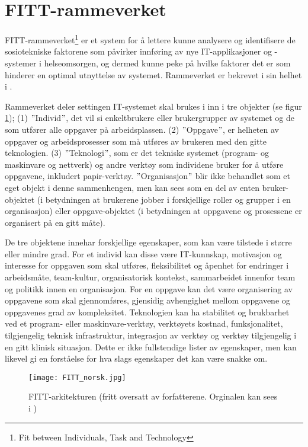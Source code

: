 \section{FITT-rammeverket}
\label{sec:fitt-rammeverket}

FITT-rammeverket\footnote{Fit between Individuals, Task and Technology} er et system for å lettere kunne analysere og identifisere de sosiotekniske faktorene som påvirker innføring av nye IT-applikasjoner og -systemer i helseomsorgen, og dermed kunne peke på hvilke faktorer det er som hinderer en optimal utnyttelse av systemet. Rammeverket er bekrevet i sin helhet i \citep{FITT}.

\noindent
Rammeverket deler settingen IT-systemet skal brukes i inn i tre objekter (se figur \ref{FITT-arkitekturen}); (1) $"$Individ$"$, det vil si enkeltbrukere eller brukergrupper av systemet og de som utfører alle oppgaver på arbeidsplassen. (2) $"$Oppgave$"$, er helheten av oppgaver og arbeidsprosesser som må utføres av brukeren med den gitte teknologien. (3) $"$Teknologi$"$, som er det tekniske systemet (program- og maskinvare og nettverk) og andre verktøy som individene bruker for å utføre oppgavene, inkludert papir-verktøy.
$"$Organisasjon$"$ blir ikke behandlet som et eget objekt i denne sammenhengen, men kan sees som en del av enten bruker-objektet (i betydningen at brukerene jobber i forskjellige roller og grupper i en organisasjon) eller oppgave-objektet (i betydningen at oppgavene og prosessene er organisert på en gitt måte).

\noindent
De tre objektene innehar forskjellige egenskaper, som kan være tilstede i større eller mindre grad. For et individ kan disse være IT-kunnskap, motivasjon og interesse for oppgaven som skal utføres, fleksibilitet og åpenhet for endringer i arbeidsmåte, team-kultur, organisatorisk kontekst, sammarbeidet innenfor team og politikk innen en organisasjon. For en oppgave kan det være organisering av oppgavene som skal gjennomføres, gjensidig avhengighet mellom oppgavene og oppgavenes grad av kompleksitet. Teknologien kan ha stabilitet og brukbarhet ved et program- eller maskinvare-verktøy, verktøyets kostnad, funksjonalitet, tilgjengelig teknisk infrastruktur, integrasjon av verktøy og verktøy tilgjengelig i en gitt klinisk situasjon. Dette er ikke fullstendige lister av egenskaper, men kan likevel gi en forståelse for hva slags egenskaper det kan være snakke om.

\begin{figure}[H]
\centering
\texttt{[image: FITT\_norsk.jpg]}
\caption{FITT-arkitekturen (fritt oversatt av forfatterene. Orginalen kan sees i \citep{FITT})}
\label{FITT-arkitekturen}
\end{figure}

